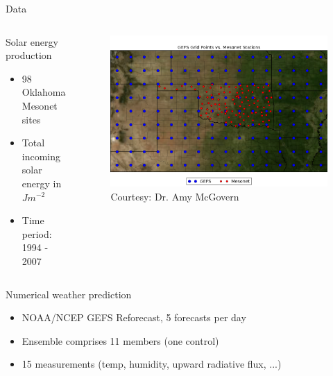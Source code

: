 \documentclass[handout]{beamer}
\begin{document}

\begin{frame}{Data}

\begin{columns}[T]
    \begin{column}{.45\textwidth}

\begin{block}{Solar energy production}
  \begin{itemize}
     \item 98 Oklahoma Mesonet sites
     \item Total incoming solar energy in $J m^{-2}$
     \item Time period: 1994 - 2007
  \end{itemize}
\end{block}

    \end{column}
    \begin{column}{.45\textwidth}

  \begin{figure}
    \includegraphics[width=\textwidth]{images/gefs_mesonet_stations.png}\\
    {\color{gray}\tiny{Courtesy: Dr. Amy McGovern}}
  \end{figure}

    \end{column}
  \end{columns}

\begin{block}{Numerical weather prediction}
\begin{itemize}
     \item NOAA/NCEP GEFS Reforecast, 5 forecasts per day
     \item Ensemble comprises 11 members (one control)
     \item 15 measurements (temp, humidity, upward radiative flux, ...)
  \end{itemize}
\end{block}

\end{frame}
\end{document}
